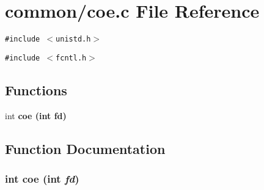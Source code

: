 \section{common/coe.c File Reference}
\label{coe_8c}
{\tt \#include $<$unistd.h$>$}\par
{\tt \#include $<$fcntl.h$>$}\par
\subsection*{Functions}
\begin{CompactItemize}
\item 
int \bf{coe} (int fd)
\end{CompactItemize}


\subsection{Function Documentation}
\subsubsection{\setlength{\rightskip}{0pt plus 5cm}int coe (int {\em fd})}\label{coe_8c_6f62c7c1b4bf6b953fe68fca5e8a1359}


